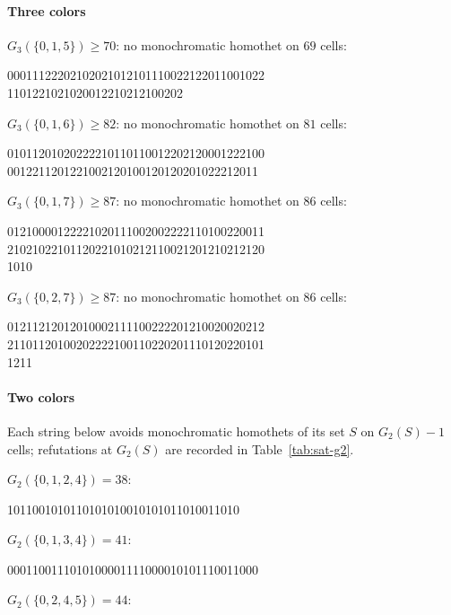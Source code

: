\documentclass[12pt]{article}
\begin{document}
\paragraph{Three colors}

$G_{3}(\{0,1,5\})\ge 70$: no monochromatic homothet on $69$ cells:

\begin{center}\ttfamily\footnotesize
00011122202102021012101110022122011001022\\
1101221021020012210212100202
\end{center}
$G_{3}(\{0,1,6\})\ge 82$: no monochromatic homothet on $81$ cells:

\begin{center}\ttfamily\footnotesize
01011201020222210110110012202120001222100\\
0012211201221002120100120120201022212011
\end{center}
$G_{3}(\{0,1,7\})\ge 87$: no monochromatic homothet on $86$ cells:

\begin{center}\ttfamily\footnotesize
01210000122221020111002002222110100220011\\
21021022101120221010212110021201210212120\\
1010
\end{center}
$G_{3}(\{0,2,7\})\ge 87$: no monochromatic homothet on $86$ cells:

\begin{center}\ttfamily\footnotesize
01211212012010002111100222201210020020212\\
21101120100202222100110220201110120220101\\
1211
\end{center}

\paragraph{Two colors}
Each string below avoids monochromatic homothets of its set $S$ on
$G_{2}(S)-1$ cells; refutations at $G_{2}(S)$ are recorded in
Table~\ref{tab:sat-g2}.

$G_{2}(\{0,1,2,4\})=38$:

\begin{center}\ttfamily\footnotesize
1011001010110101010010101011010011010
\end{center}
$G_{2}(\{0,1,3,4\})=41$:

\begin{center}\ttfamily\footnotesize
0001100111010100001111000010101110011000
\end{center}
$G_{2}(\{0,2,4,5\})=44$:
\end{document}
